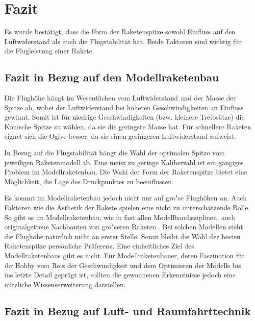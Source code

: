 \documentclass[10pt,a4paper]{article}
\begin{document}
\section{Fazit}

Es wurde bestätigt, dass die Form der Raketenspitze sowohl Einfluss auf den Luftwiderstand als auch die Flugstabilität hat. Beide Faktoren sind wichtig für die Flugleistung einer Rakete.


\subsection{Fazit in Bezug auf den Modellraketenbau}

Die Flughöhe hängt im Wesentlichen vom Luftwiderstand und der Masse der Spitze ab, wobei der Luftwiderstand bei höheren Geschwindigkeiten an Einfluss gewinnt. Somit ist für niedrige Geschwindigkeiten (bzw. kleinere Treibsätze) die Konische Spitze zu wählen, da sie die geringste Masse hat. Für schnellere Raketen eignet sich die Ogive besser, da sie einen geringeren Luftwiderstand aufweist.

In Bezug auf die Flugstabilität hängt die Wahl der optimalen Spitze vom jeweiligen Raketenmodell ab. Eine meist zu geringe Kaliberzahl ist ein gängiges Problem im Modellraketenbau. Die Wahl der Form der Raketenspitze bietet eine Möglichkeit, die Lage des Druckpunktes zu beeinflussen.

Es kommt im Modellraketenbau jedoch nicht nur auf gro"se Flughöhen an. Auch Faktoren wie die Ästhetik der Rakete spielen eine nicht zu unterschätzende Rolle. So gibt es im Modellraketenbau, wie in fast allen Modellbaudisziplinen, auch originalgetreue Nachbauten von grö"seren Raketen \cite{om}. Bei solchen Modellen steht die Flughöhe natürlich nicht an erster Stelle.
Somit bleibt die Wahl der besten Raketenspitze persönliche Präferenz. Eine einheitliches Ziel des Modellraketenbaus gibt es nicht. Für Modellraketenbauer, deren Faszination für ihr Hobby vom Reiz der Geschwindigkeit und dem Optimieren der Modelle bis ins letzte Detail geprägt ist, sollten die gewonnenen Erkenntnisse jedoch eine nützliche Wissenserweiterung darstellen.


\subsection{Fazit in Bezug auf Luft- und Raumfahrttechnik}
\end{document}
